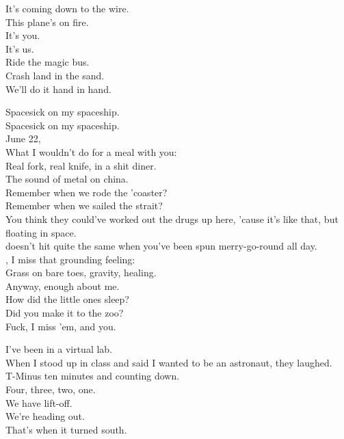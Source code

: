 
It's coming down to the wire. \\
This plane's on fire. \\
It's you. \\
It's us. \\
Ride the magic bus. \\
Crash land in the sand. \\
We'll do it hand in hand. \\





Spacesick on my spaceship. \\
Spacesick on my spaceship. \\

June 22, \\
What I wouldn't do for a meal with you: \\
Real fork, real knife, in a shit diner. \\
The sound of metal on china. \\
Remember when we rode the 'coaster? \\
Remember when we sailed the strait? \\
You think they could've worked out the drugs up here, 'cause it's like that, but floating in space. \\

 doesn't hit quite the same when you've been spun merry-go-round all day. \\
, I miss that grounding feeling: \\
Grass on bare toes, gravity, healing. \\
Anyway, enough about me. \\
How did the little ones sleep? \\
Did you make it to the zoo? \\
Fuck, I miss 'em, and you. \\


I've been  in a virtual lab. \\
When I stood up in class and said I wanted to be an astronaut, they laughed. \\
T-Minus ten minutes and counting down. \\
Four, three, two, one. \\
We have lift-off. \\
We're heading out. \\
That's when it turned south. \\

